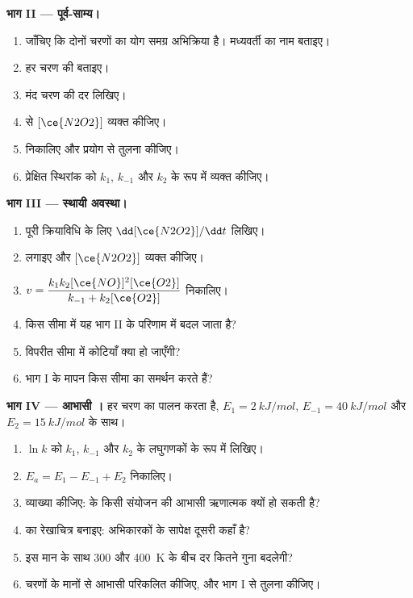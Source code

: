 \begin{problem}
\medskip
\noindent\textbf{भाग II --- पूर्व-साम्य।}
\begin{enumerate}[resume]
  \item जाँचिए कि दोनों चरणों का योग समग्र अभिक्रिया है। मध्यवर्ती
        का नाम बताइए।
  \item हर चरण की  बताइए।
  \item मंद चरण की दर लिखिए।
  \item {} से $[\ce{N2O2}]$ व्यक्त कीजिए।
  \item {} निकालिए और प्रयोग से तुलना कीजिए।
  \item प्रेक्षित स्थिरांक को $k_1$, $k_{-1}$ और $k_2$ के रूप में व्यक्त कीजिए।
\end{enumerate}

\medskip
\noindent\textbf{भाग III --- स्थायी अवस्था।}
\begin{enumerate}[resume]
  \item पूरी क्रियाविधि के लिए $\dd[\ce{N2O2}]/\dd t$ लिखिए।
  \item {} लगाइए और $[\ce{N2O2}]$ व्यक्त कीजिए।
  \item {} $v = \dfrac{k_1k_2[\ce{NO}]^2[\ce{O2}]}{k_{-1} +
        k_2[\ce{O2}]}$ निकालिए।
  \item किस सीमा में यह भाग II के परिणाम में बदल जाता है?
  \item विपरीत सीमा में कोटियाँ क्या हो जाएँगी?
  \item भाग I के मापन किस सीमा का समर्थन करते हैं?
\end{enumerate}

\medskip
\noindent\textbf{भाग IV --- आभासी ।}
हर चरण  का पालन करता है,  $E_1 =
\qty{2}{kJ/mol}$, $E_{-1} = \qty{40}{kJ/mol}$ और $E_2 =
\qty{15}{kJ/mol}$ के साथ।
\begin{enumerate}[resume]
  \item $\ln k$ को $k_1$, $k_{-1}$ और
        $k_2$ के लघुगणकों के रूप में लिखिए।
  \item $E_a = E_1 - E_{-1} + E_2$ निकालिए।
  \item व्याख्या कीजिए:  के किसी संयोजन की आभासी 
        ऋणात्मक क्यों हो सकती है?
  \item {} का रेखाचित्र बनाइए: अभिकारकों  के सापेक्ष
        दूसरी  कहाँ है?
  \item इस मान के साथ 300 और \qty{400}{K} के बीच दर कितने गुना बदलेगी?
  \item चरणों के मानों से आभासी  परिकलित कीजिए, और
        भाग I से तुलना कीजिए।
\end{enumerate}
\end{problem}
